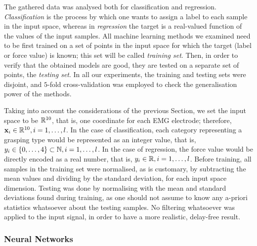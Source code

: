 The gathered data was analysed both for classification and
regression. \emph{Classification} is the process by which one wants to
assign a label to each sample in the input space, whereas in
\emph{regression} the target is a real-valued function of the values
of the input samples. All machine learning methods we examined need to
be first trained on a set of points in the input space for which the
target (label or force value) is known; this set will be called
\emph{training set}. Then, in order to verify that the obtained models
are good, they are tested on a separate set of points, the
\emph{testing set}. In all our experiments, the training and testing
sets were disjoint, and $5$-fold cross-validation was employed to
check the generalisation power of the methods.

Taking into account the considerations of the previous Section, we set
the input space to be $\mathbb{R}^{10}$, that is, one coordinate for each EMG
electrode; therefore, $\mathbf{x}_i \in \mathbb{R}^{10}, i=1,\ldots,l$. In the case
of classification, each category representing a grasping type would be
represented as an integer value, that is, $y_i \in \{0,\ldots,4\}
\subset \mathbb{N}, i=1,\ldots,l$. In the case of regression, the force value
would be directly encoded as a real number, that is, $y_i \in \mathbb{R},
i=1,\ldots,l$. Before training, all samples in the training set were
normalised, as is customary, by subtracting the mean values and
dividing by the standard deviation, for each input space
dimension. Testing was done by normalising with the mean and standard
deviations found during training, as one should not assume to know any
a-priori statistics whatsoever about the testing samples. No filtering
whatsoever was applied to the input signal, in order to have a more
realistic, delay-free result.

\subsubsection{Neural Networks}

